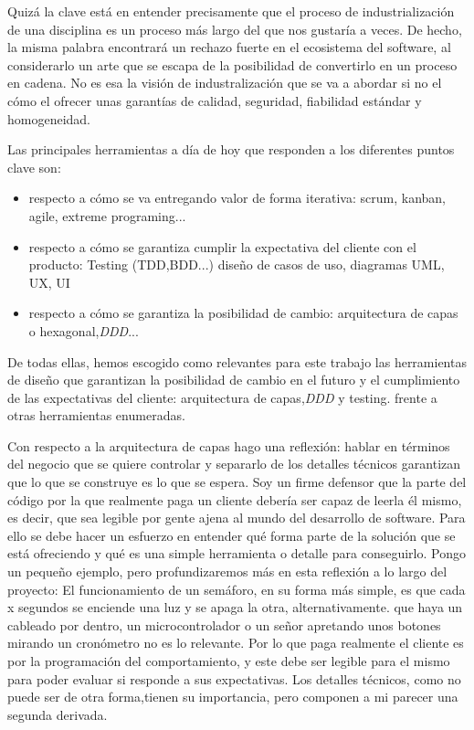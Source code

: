 Quizá la clave está en entender precisamente que el proceso de industrialización de una disciplina es un proceso más largo del que nos gustaría a veces. De hecho, la misma palabra encontrará un rechazo fuerte en el ecosistema del software, al considerarlo un arte que se escapa de la posibilidad de convertirlo en un proceso en cadena. No es esa la visión de industralización que se va a abordar si no el cómo el ofrecer unas garantías de calidad, seguridad, fiabilidad estándar y homogeneidad.

Las principales herramientas a día de hoy que responden a los diferentes puntos clave son:

\begin{itemize}
	\item respecto a cómo se va entregando valor de forma iterativa: scrum, kanban, agile, extreme programing...
	\item respecto a cómo se garantiza cumplir la expectativa del cliente con el producto: Testing (TDD,BDD...) diseño de casos de uso, diagramas UML, UX, UI
	\item respecto a cómo se garantiza la posibilidad de cambio: arquitectura de capas o hexagonal,\textit{DDD}...
\end{itemize} 

De todas ellas, hemos escogido como relevantes para este trabajo las herramientas de diseño que garantizan la posibilidad de cambio en el futuro y el cumplimiento de las expectativas del cliente: arquitectura de capas,\textit{DDD} y testing. frente a otras herramientas enumeradas.

Con respecto a la arquitectura de capas hago una reflexión: hablar en términos del negocio que se quiere controlar y separarlo de los detalles técnicos garantizan que lo que se construye es lo que se espera. Soy un firme defensor que la parte del código por la que realmente paga un cliente debería ser capaz de leerla él mismo, es decir, que sea legible por gente ajena al mundo del desarrollo de software. Para ello se debe hacer un esfuerzo en entender qué forma parte de la solución que se está ofreciendo y qué es una simple herramienta o detalle para conseguirlo. Pongo un pequeño ejemplo, pero profundizaremos más en esta reflexión a lo largo del proyecto: El funcionamiento de un semáforo, en su forma más simple, es que cada x segundos se enciende una luz y se apaga la otra, alternativamente. que haya un cableado por dentro, un microcontrolador o un señor apretando unos botones mirando un cronómetro no es lo relevante. Por lo que paga realmente el cliente es por la programación del comportamiento, y este debe ser legible para el mismo para poder evaluar si responde a sus expectativas. Los detalles técnicos, como no puede ser de otra forma,tienen su importancia, pero componen a mi parecer una segunda derivada.

